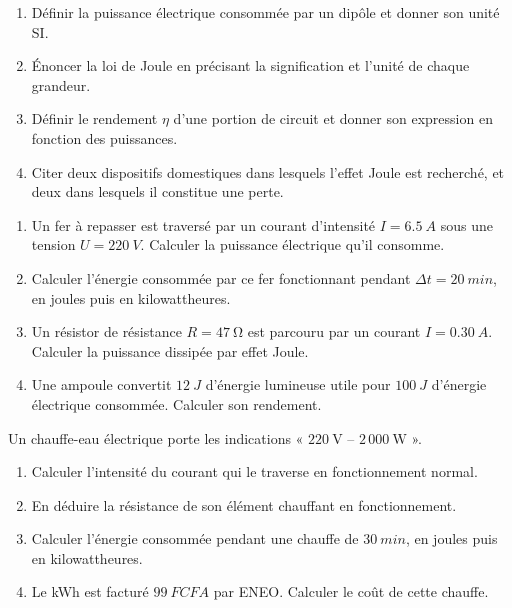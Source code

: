 \documentclass[11pt]{article}
\newcommand{\cle}[1]{{\popxbold\color{popdark}#1}}
\newcounter{popsec}
\newcounter{popsub}
\newcommand{\courssub}[1]{%
  \stepcounter{popsub}%
  \par\vspace{9pt}\noindent{\popxbold\fontsize{11.5}{13}\selectfont\color{popink}{\color{poporange}\thepopsec.\thepopsub}\hspace{6pt}#1}\par\nopagebreak\vspace{4pt}
}
\begin{document}
\begin{exercice}
\begin{enumerate}
\item Définir la \cle{puissance électrique} consommée par un dipôle et donner son unité SI.
\item Énoncer la \cle{loi de Joule} en précisant la signification et l'unité de chaque grandeur.
\item Définir le \cle{rendement} $\eta$ d'une portion de circuit et donner son expression en fonction des puissances.
\item Citer deux dispositifs domestiques dans lesquels l'effet Joule est recherché, et deux dans lesquels il constitue une perte.
\end{enumerate}
\end{exercice}

\begin{exercice}
\begin{enumerate}
\item Un fer à repasser est traversé par un courant d'intensité $I = \SI{6,5}{A}$ sous une tension $U = \SI{220}{V}$. Calculer la puissance électrique qu'il consomme.
\item Calculer l'énergie consommée par ce fer fonctionnant pendant $\Delta t = \SI{20}{min}$, en joules puis en kilowattheures.
\item Un résistor de résistance $R = \SI{47}{\ohm}$ est parcouru par un courant $I = \SI{0,30}{A}$. Calculer la puissance dissipée par effet Joule.
\item Une ampoule convertit $\SI{12}{J}$ d'énergie lumineuse utile pour $\SI{100}{J}$ d'énergie électrique consommée. Calculer son rendement.
\end{enumerate}
\end{exercice}

\courssub{Je m'entraîne}

\begin{exercice}
Un chauffe-eau électrique porte les indications « $220\ \text{V}$ -- $2\,000\ \text{W}$ ».
\begin{enumerate}
\item Calculer l'intensité du courant qui le traverse en fonctionnement normal.
\item En déduire la résistance de son élément chauffant en fonctionnement.
\item Calculer l'énergie consommée pendant une chauffe de $\SI{30}{min}$, en joules puis en kilowattheures.
\item Le kWh est facturé $\SI{99}{FCFA}$ par ENEO. Calculer le coût de cette chauffe.
\end{enumerate}
\end{exercice}
\end{document}
